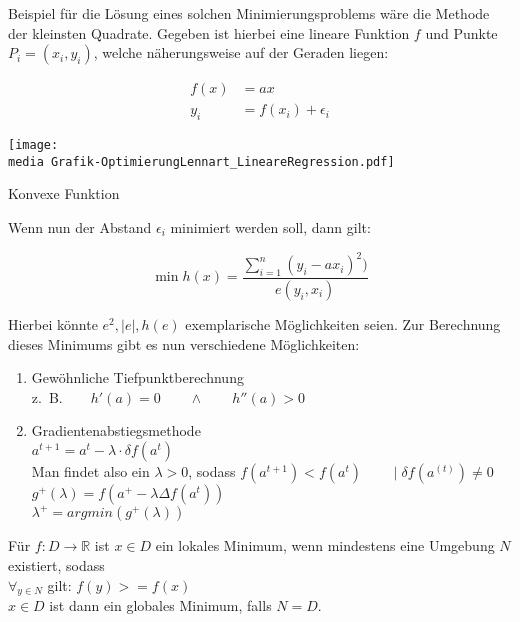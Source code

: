 \begin{Thm}
Beispiel für die Lösung eines solchen Minimierungsproblems wäre die Methode der kleinsten Quadrate. Gegeben ist hierbei eine lineare Funktion $f$ und Punkte $P_i=(x_i,y_i)$, welche näherungsweise auf der Geraden liegen:

\begin{align*}
f(x) &= ax \\
y_i &= f(x_i) + \epsilon_{i}
\end{align*}

\begin{dsafigure}
\begin{center}
\texttt{[image: \\media Grafik-OptimierungLennart\_LineareRegression.pdf]}
\caption{Konvexe Funktion}
\label{figure:Grafik-OptimierungLennart_LineareRegression.pdf}
\end{center}
\end{dsafigure}

Wenn nun der Abstand $\epsilon_i$ minimiert werden soll, dann gilt:

\begin{equation*}
\min h(x)=\frac{\sum_{i=1}^n(y_i-ax_i)^2)}{e(y_i,x_i)}
\end{equation*}

Hierbei könnte $e^2,\mid e\mid, h(e)$ exemplarische Möglichkeiten seien. Zur Berechnung dieses Minimums gibt es nun verschiedene Möglichkeiten:

\begin{enumerate}
\item Gewöhnliche Tiefpunktberechnung \\
z.~B.$\qquad h'(a)=0\qquad \wedge\qquad h''(a)>0$
\item Gradientenabstiegsmethode \\
$a^{t+1}  =a^{t} - \lambda \cdot \delta f(a^{t})$ \\
Man findet also ein $\lambda > 0$, sodass
$f(a^{t+1}) < f(a^{t})  \qquad \mid \delta f(a^{(t)}) \neq 0$ \\
$g^{+}(\lambda)=f(a^+-\lambda\Delta f(a^t))$ \\
$\lambda^+=argmin(g^+(\lambda))$
\end{enumerate}

\end{Thm}

\begin{Def}
Für $f: D\rightarrow \mathbb{R}$ ist $x\in D$ ein lokales Minimum, wenn mindestens eine Umgebung $N$ existiert, sodass \\$\forall_{y\in N}$ gilt: $f(y)>=f(x)$ \\
$x\in D$ ist dann ein globales Minimum, falls $N=D$.
\end{Def}

